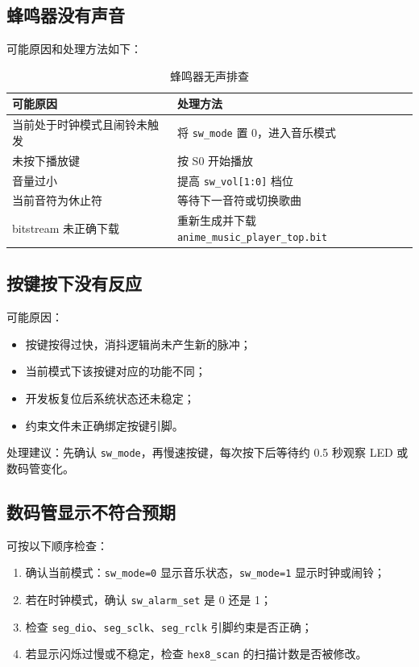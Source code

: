 \documentclass[UTF8,a4paper,12pt]{ctexart}
\newcommand{\port}[1]{\texttt{#1}}
\begin{document}
\subsection{蜂鸣器没有声音}

可能原因和处理方法如下：

\begin{table}[H]
  \centering
  \caption{蜂鸣器无声排查}
  \begin{tabular}{ll}
    \toprule
    可能原因 & 处理方法 \\
    \midrule
    当前处于时钟模式且闹铃未触发 & 将 \port{sw\_mode} 置 0，进入音乐模式 \\
    未按下播放键 & 按 S0 开始播放 \\
    音量过小 & 提高 \port{sw\_vol[1:0]} 档位 \\
    当前音符为休止符 & 等待下一音符或切换歌曲 \\
    bitstream 未正确下载 & 重新生成并下载 \port{anime\_music\_player\_top.bit} \\
    \bottomrule
  \end{tabular}
\end{table}

\subsection{按键按下没有反应}

可能原因：

\begin{itemize}
  \item 按键按得过快，消抖逻辑尚未产生新的脉冲；
  \item 当前模式下该按键对应的功能不同；
  \item 开发板复位后系统状态还未稳定；
  \item 约束文件未正确绑定按键引脚。
\end{itemize}

处理建议：先确认 \port{sw\_mode}，再慢速按键，每次按下后等待约 0.5 秒观察 LED 或数码管变化。

\subsection{数码管显示不符合预期}

可按以下顺序检查：

\begin{enumerate}
  \item 确认当前模式：\port{sw\_mode=0} 显示音乐状态，\port{sw\_mode=1} 显示时钟或闹铃；
  \item 若在时钟模式，确认 \port{sw\_alarm\_set} 是 0 还是 1；
  \item 检查 \port{seg\_dio}、\port{seg\_sclk}、\port{seg\_rclk} 引脚约束是否正确；
  \item 若显示闪烁过慢或不稳定，检查 \port{hex8\_scan} 的扫描计数是否被修改。
\end{enumerate}
\end{document}
